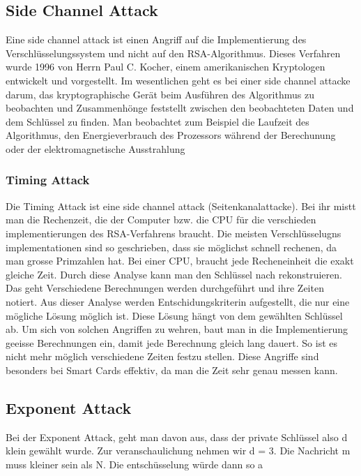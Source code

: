 %
\subsection{Side Channel Attack}
Eine side channel attack ist einen Angriff auf die Implementierung des Verschlüsselungssystem und nicht auf den RSA-Algorithmus. Dieses Verfahren wurde 1996 von Herrn Paul C. Kocher, einem amerikanischen Kryptologen entwickelt und vorgestellt.
Im wesentlichen geht es bei einer side channel attacke darum, das kryptographische Gerät beim Ausführen des Algorithmus zu beobachten und Zusammenhönge feststellt zwischen den beobachteten Daten und dem Schlüssel zu finden.
Man beobachtet zum Beispiel die Laufzeit des Algorithmus, den Energieverbrauch des Prozessors während der Berechunung oder der elektromagnetische Ausstrahlung
%
\subsubsection{Timing Attack}
Die Timing Attack ist eine side channel attack (Seitenkanalattacke). 
Bei ihr mistt man die Rechenzeit, die der Computer bzw. die CPU für die verschieden implementierungen des RSA-Verfahrens braucht. Die meisten Verschlüsselugns implementationen sind so geschrieben, dass sie möglichst schnell rechenen, da man grosse Primzahlen hat. Bei einer CPU, braucht jede Recheneinheit die exakt gleiche Zeit. Durch diese Analyse kann man den Schlüssel nach rekonstruieren. Das geht 
%
Verschiedene Berechnungen werden durchgeführt und ihre Zeiten notiert. Aus dieser Analyse werden Entschidungskriterin aufgestellt, die nur eine mögliche Lösung möglich ist. Diese Lösung hängt von dem gewählten Schlüssel ab.
%
Um sich von solchen Angriffen zu wehren, baut man in die Implementierung geeisse Berechnungen ein, damit jede Berechnung gleich lang dauert. So ist es nicht mehr möglich verschiedene Zeiten festzu stellen.
%
Diese Angriffe sind besonders bei Smart Cards effektiv, da man die Zeit sehr genau messen kann.
%
\subsection{Exponent Attack}
Bei der Exponent Attack, geht man davon aus, dass der private Schlüssel also d klein gewählt wurde. Zur veranschaulichung nehmen wir d = 3.
Die Nachricht m muss kleiner sein als N. Die entschüsselung würde dann so a
%
